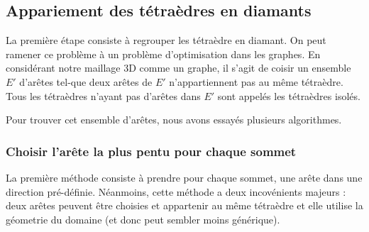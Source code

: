 \documentclass[a4paper,11pt,openany]{article}
\begin{document}
\subsection{Appariement des tétraèdres en diamants}
La première étape consiste à regrouper les tétraèdre en diamant. On peut ramener ce problème à un problème d'optimisation dans les graphes. En considérant notre maillage 3D comme un graphe, il s'agit de coisir un ensemble $E'$ d'arêtes tel-que deux arêtes de $E'$ n'appartiennent pas au même tétraèdre. Tous les tétraèdres n'ayant pas d'arêtes dans $E'$ sont appelés les tétraèdres isolés.\\
\begin{figure}[H]
\begin{center}
\end{center}
\end{figure}
\noindent
Pour trouver cet ensemble d'arêtes, nous avons essayés plusieurs algorithmes.
\subsubsection{Choisir l'arête la plus pentu pour chaque sommet}
La première méthode consiste à prendre pour chaque sommet, une arête dans une direction pré-définie. Néanmoins, cette méthode a deux incovénients majeurs : deux arêtes peuvent être choisies et appartenir au même tétraèdre et elle utilise la géometrie du domaine (et donc peut sembler moins générique).

\begin{figure}[H]
\begin{center}
\end{center}
\end{figure}
\end{document}
